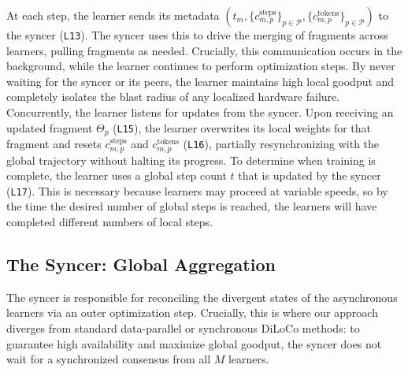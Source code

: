 \documentclass[11pt, a4paper, twocolumn, copyright, google]{google}
\begin{document}
At each step, the learner sends its metadata $(t_m, \{c^{\text{steps}}_{m, p}\}_{p \in \mathcal{P}}, \{c^{\text{tokens}}_{m, p}\}_{p\in \mathcal{P}})$ to the syncer (\texttt{L13}).
The syncer uses this to drive the merging of fragments across learners, pulling fragments as needed.
Crucially, this communication occurs in the background, while the learner continues to perform optimization steps. By never waiting for the syncer or its peers, the learner maintains high local goodput and completely isolates the blast radius of any localized hardware failure. Concurrently, the learner listens for updates from the syncer. Upon receiving an updated fragment $\Theta_p$ (\texttt{L15}), the learner overwrites its local weights for that fragment and resets $c^{\text{steps}}_{m, p}$ and $c^{\text{tokens}}_{m, p}$ (\texttt{L16}), partially resynchronizing with the global trajectory without halting its progress. To determine when training is complete, the learner uses a global step count $t$ that is updated by the syncer (\texttt{L17}). This is necessary because learners may proceed at variable speeds, so by the time the desired number of global steps is reached, the learners will have completed different numbers of local steps.

\subsection{The Syncer: Global Aggregation}\label{sec:decoupled_syncer}

The syncer is responsible for reconciling the divergent states of the asynchronous learners via an outer optimization step. Crucially, this is where our approach diverges from standard data-parallel or synchronous DiLoCo methods: to guarantee high availability and maximize global goodput, the syncer does not wait for a synchronized consensus from all $M$ learners.
\end{document}
